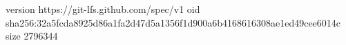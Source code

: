 version https://git-lfs.github.com/spec/v1
oid sha256:32a5fcda8925d86a1fa2d47d5a1356f1d900a6b4168616308ae1ed49cee6014c
size 2796344
